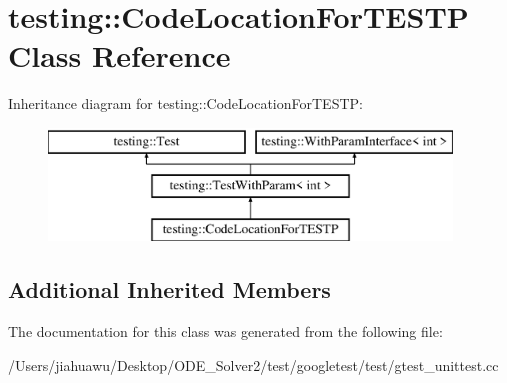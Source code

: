 \hypertarget{classtesting_1_1_code_location_for_t_e_s_t_p}{}\section{testing\+:\+:Code\+Location\+For\+T\+E\+S\+TP Class Reference}
\label{classtesting_1_1_code_location_for_t_e_s_t_p}
Inheritance diagram for testing\+:\+:Code\+Location\+For\+T\+E\+S\+TP\+:\begin{figure}[H]
\begin{center}
\leavevmode
\includegraphics[height=3.000000cm]{classtesting_1_1_code_location_for_t_e_s_t_p}
\end{center}
\end{figure}
\subsection*{Additional Inherited Members}


The documentation for this class was generated from the following file\+:\begin{DoxyCompactItemize}
\item 
/\+Users/jiahuawu/\+Desktop/\+O\+D\+E\+\_\+\+Solver2/test/googletest/test/gtest\+\_\+unittest.\+cc\end{DoxyCompactItemize}
